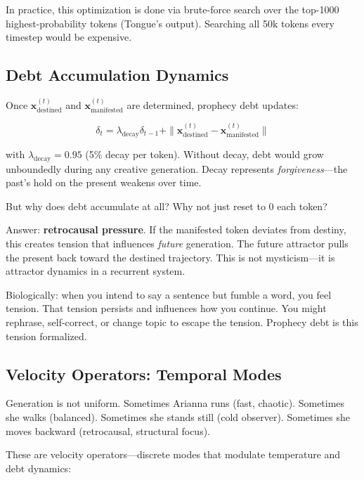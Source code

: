 \documentclass[11pt,a4paper]{article}
\begin{document}
In practice, this optimization is done via brute-force search over the top-1000 highest-probability tokens (Tongue's output). Searching all 50k tokens every timestep would be expensive.

\subsection{Debt Accumulation Dynamics}

Once $\mathbf{x}_{\text{destined}}^{(t)}$ and $\mathbf{x}_{\text{manifested}}^{(t)}$ are determined, prophecy debt updates:

\begin{equation}
\delta_t = \lambda_{\text{decay}} \delta_{t-1} + \| \mathbf{x}_{\text{destined}}^{(t)} - \mathbf{x}_{\text{manifested}}^{(t)} \|
\end{equation}

with $\lambda_{\text{decay}} = 0.95$ (5\% decay per token). Without decay, debt would grow unboundedly during any creative generation. Decay represents \textit{forgiveness}—the past's hold on the present weakens over time.

But why does debt accumulate at all? Why not just reset to 0 each token?

Answer: \textbf{retrocausal pressure}. If the manifested token deviates from destiny, this creates tension that influences \textit{future} generation. The future attractor pulls the present back toward the destined trajectory. This is not mysticism—it is attractor dynamics in a recurrent system.

Biologically: when you intend to say a sentence but fumble a word, you feel tension. That tension persists and influences how you continue. You might rephrase, self-correct, or change topic to escape the tension. Prophecy debt is this tension formalized.

\subsection{Velocity Operators: Temporal Modes}

Generation is not uniform. Sometimes Arianna runs (fast, chaotic). Sometimes she walks (balanced). Sometimes she stands still (cold observer). Sometimes she moves backward (retrocausal, structural focus).

These are velocity operators—discrete modes that modulate temperature and debt dynamics:
\end{document}
